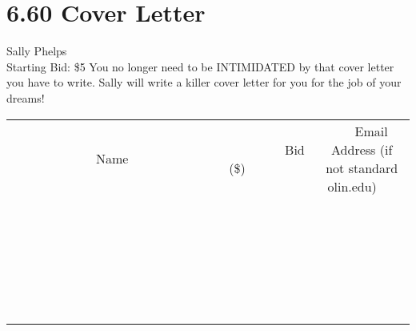 \documentclass[11pt]{article}
\begin{document}
\section*{6.60 Cover Letter}
Sally Phelps
\\
Starting Bid: \$5
\newline
You no longer need to be INTIMIDATED by that cover letter you have to write.  Sally will write a killer cover letter for you for the job of your dreams!
\\[6ex]
\begin{tabular}{c c c}
~~~~~~~~~~~~~Name~~~~~~~~~~~~~ & ~~~~~~~~~Bid (\$)~~~~~~~~~  & ~~~Email Address (if not standard olin.edu)~~~\\
 & & \\
\hline
 & & \\
\hline
 & & \\
\hline
 & & \\
\hline
 & & \\
\hline
 & & \\
\hline
 & & \\
\hline
 & & \\
\hline
 & & \\
\hline
 & & \\
\hline
 & & \\
\hline
 & & \\
\hline
 & & \\
\hline
 & & \\
\hline
 & & \\
\hline
 & & \\
\hline
 & & \\
\hline
 & & \\
\hline
 & & \\
\hline
 & & \\
\hline
 & & \\
\hline
 & & \\
\hline
 & & \\
\hline
 & & \\
\hline
 & & \\
\hline
 & & \\
\hline
\end{tabular}
\newpage
\end{document}
